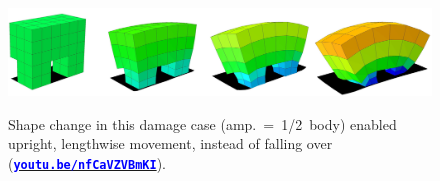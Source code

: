 \begin{figure}[h!]
\begin{center}
\includegraphics[trim={0 0 0 0},clip,width=\linewidth]{Chapter05/fig/scruncher.jpg}\\
\caption{\label{fig5:scruncher}
Shape change in this damage case (amp.~=~1/2~body) enabled upright, lengthwise movement, instead of falling over
(\href{https://youtu.be/nfCaVZVBmKI}{\textcolor{blue}{\textbf{\texttt{youtu.be/nfCaVZVBmKI}}}}).
}
\vspace{-1em}
\end{center}
\end{figure}